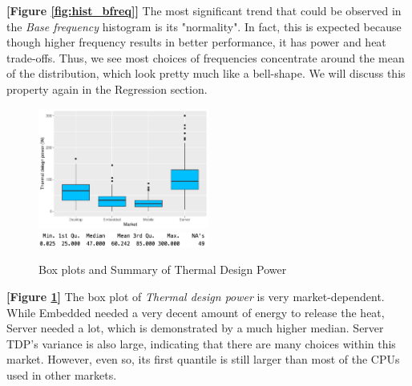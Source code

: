 
\textbf{[Figure \ref{fig:hist_bfreq}]} The most significant trend that could be observed in the \textit{Base frequency} histogram is its "normality".
In fact, this is expected because though higher frequency results in better performance, it has power and heat trade-offs. Thus, we see most choices of
frequencies concentrate around the mean of the distribution, which look pretty much like a bell-shape. We will discuss this property again in the Regression
section.






\begin{figure}[H]
    \centering
    \includegraphics[width=0.5\textwidth]{./graphics/box_tdp.pdf}
    \includegraphics[width=0.5\textwidth]{./graphics/sum_tdp.png}
    \caption{Box plots and Summary of Thermal Design Power}
    \label{fig:box_tdp}
\end{figure}


\textbf{[Figure \ref{fig:box_tdp}]} The box plot of \textit{Thermal design power} is very market-dependent. While Embedded needed a very decent amount of
energy to release the heat, Server needed a lot, which is demonstrated by a much higher median. Server TDP's variance is also large, indicating
that there are many choices within this market. However, even so, its first quantile is still larger than most of the CPUs used in other markets.











